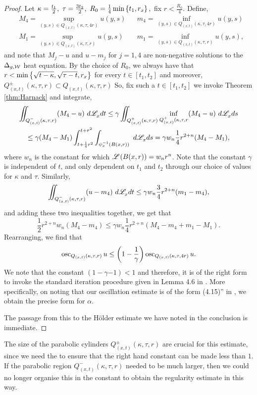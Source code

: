 \documentclass[a4paper, 12pt]{amsart}
\begin{document}
\begin{proof}
Let 
$\kappa = \frac{t_1}{2},\ \tau = \frac{3t_2}{2},\ R_0 = \frac{1}{4} \min\left\{t_1, r_x\right\},$ fix $r < \frac{R_0}{4}$.
Define, 
\begin{align*}
&M_4 = \sup_{(y,s) \in Q_{(x,t)}(\kappa, \tau, 4r)} u(y,s) &&m_4 = \inf_{(y,s) \in Q_{(x,t)}(\kappa, \tau, 4r)} u(y,s) \\
&M_1 = \sup_{(y,s) \in Q_{(x,t)}(\kappa, \tau, r)} u(y,s) &&m_1 = \inf_{(y,s) \in Q_{(x,t)}(\kappa, \tau, r)} u(y,s), 
\end{align*} 
and note that $M_j - u$ and $u - m_j$ for $j = 1, 4$ are non-negative
solutions to the $\Delta_{g,\mathcal{W}}$ heat equation.
By the choice of $R_0$,
we always have that $r < \min\left\{ \sqrt{t - \kappa}, \sqrt{\tau - t}, r_x\right\}$
for every $t \in [t_1, t_2]$
and moreover,  $Q^{\pm}_{(x,t)}(\kappa,\tau,r) \subset Q_{(x,t)}(\kappa, \tau, r)$
So, fix such a $t \in [t_1, t_2]$ we invoke Theorem \ref{thm:Harnack} and integrate,
\begin{multline*}
\iint_{Q^-_{(x,t)}(\kappa,\tau,r)} (M_4 - u)\ d\Leb_x dt 
	\leq \gamma \iint_{Q^+_{(x,t)}(\kappa,\tau,r)} \inf_{Q^+_{(x,t)}(\kappa, \tau, r} (M_4 - u)\ d\Leb_x ds \\
	\leq \gamma (M_4 - M_1) \int_{t+ \frac{1}{4}r^2}^{t + r^2} \int_{\psi_x^{-1}(B(x,r))}\ d\Leb_x ds
	= \gamma w_n  \frac{1}{4}r^{2+n} (M_4 - M_1),$$
\end{multline*}
where $w_n$ is the constant for which $\mathscr{L}^{{}}(B(x,r)) = w_n r^n$.
Note that the constant $\gamma$ is independent of $t$, and only 
dependent on $t_1$ and $t_2$ through our choice
of values for $\kappa$ and $\tau$. 
Similarly, 
$$
\iint_{Q^-_{(x,t)}(\kappa,\tau,r)} (u - m_4)\ d\Leb_x dt \leq \gamma w_n \frac{3}{4}r^{2+n} (m_1 - m_4),$$
and adding these two inequalities together, 
we get that
$$
\frac{1}{2}r^{2+n} w_n (M_4 - m_4) \leq \gamma w_n \frac{1}{4}r^{2+n} (M_4 - m_4 +m_1 - M_1).$$
Rearranging, we find that 
$$
\operatorname{osc}_{Q_{(x,t)}(\kappa, \tau, r)} u \leq \left(1 - \frac{1}{\gamma}\right) \operatorname{osc}_{Q_{(x,t)}(\kappa, \tau, 4r)} u.$$
We note that the constant $(1 - \gamma{-1}) < 1$
and therefore, it is of the right form to invoke the
standard iteration procedure given in Lemma 4.6 in \cite{Lieberman}. 
More specifically, on noting that
our oscillation estimate is of the form (4.15)'' in \cite{Lieberman},
we obtain the precise form for $\alpha$.

The passage from this to the Hölder estimate
we have noted in the conclusion is immediate. 
\end{proof}

\begin{rem}
The size of the parabolic cylinders
$Q^{\pm}_{(x,t)}(\kappa, \tau, r)$
are crucial for this estimate, since we need
the to ensure that the right hand constant 
can be made less than $1$. If the parabolic
region $Q^{-}_{(x,t)}(\kappa, \tau, r)$
needed to be much larger, then we could no 
longer organise this in the constant to 
obtain the regularity estimate in this way. 
\end{rem}

\printbibliography
\end{document}
